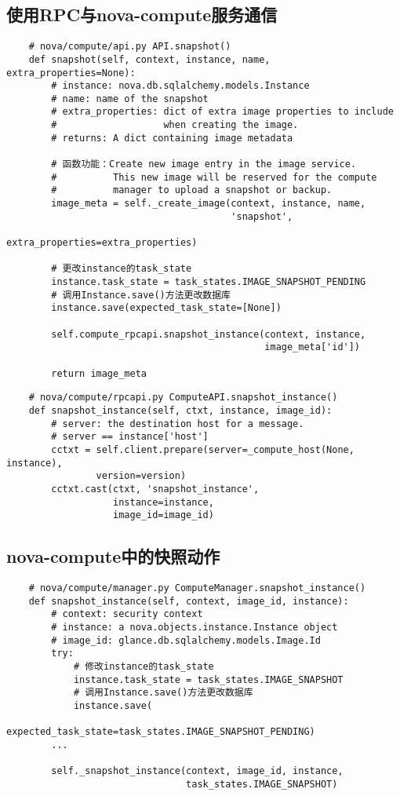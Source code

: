 \documentclass[a4paper,left=1.5cm,right=1.5cm,11pt]{article}
\begin{document}
\subsection{使用RPC与nova-compute服务通信}

    \begin{lstlisting}
    # nova/compute/api.py API.snapshot()
    def snapshot(self, context, instance, name, extra_properties=None):
        # instance: nova.db.sqlalchemy.models.Instance
        # name: name of the snapshot
        # extra_properties: dict of extra image properties to include
        #                   when creating the image.
        # returns: A dict containing image metadata

        # 函数功能：Create new image entry in the image service.  
        #          This new image will be reserved for the compute 
        #          manager to upload a snapshot or backup.
        image_meta = self._create_image(context, instance, name,
                                        'snapshot',
                                        extra_properties=extra_properties)

        # 更改instance的task_state
        instance.task_state = task_states.IMAGE_SNAPSHOT_PENDING
        # 调用Instance.save()方法更改数据库
        instance.save(expected_task_state=[None])

        self.compute_rpcapi.snapshot_instance(context, instance,
                                              image_meta['id'])

        return image_meta
    \end{lstlisting}

    \begin{lstlisting}
    # nova/compute/rpcapi.py ComputeAPI.snapshot_instance()
    def snapshot_instance(self, ctxt, instance, image_id):
        # server: the destination host for a message.
        # server == instance['host']
        cctxt = self.client.prepare(server=_compute_host(None, instance),
                version=version)
        cctxt.cast(ctxt, 'snapshot_instance',
                   instance=instance,
                   image_id=image_id)
    \end{lstlisting}

\subsection{nova-compute中的快照动作}
    \begin{lstlisting}
    # nova/compute/manager.py ComputeManager.snapshot_instance()
    def snapshot_instance(self, context, image_id, instance):
        # context: security context
        # instance: a nova.objects.instance.Instance object
        # image_id: glance.db.sqlalchemy.models.Image.Id
        try:
            # 修改instance的task_state
            instance.task_state = task_states.IMAGE_SNAPSHOT
            # 调用Instance.save()方法更改数据库
            instance.save(
                        expected_task_state=task_states.IMAGE_SNAPSHOT_PENDING)
        ...

        self._snapshot_instance(context, image_id, instance,
                                task_states.IMAGE_SNAPSHOT)
    \end{lstlisting}
\end{document}
